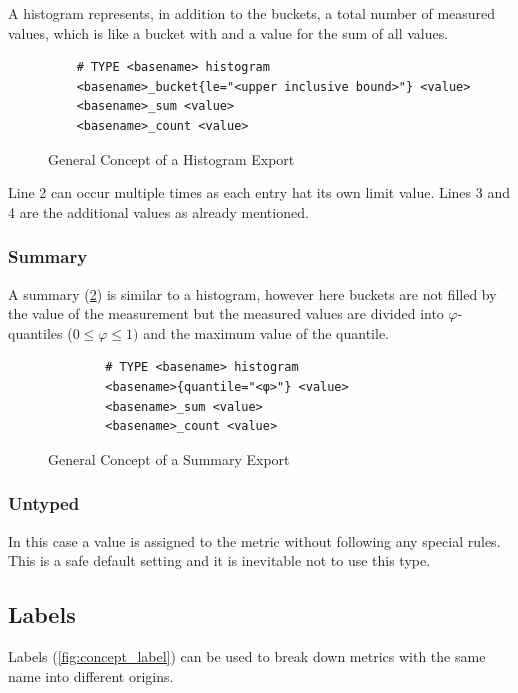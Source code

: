A histogram represents, in addition to the buckets, a total number of measured values, which is like a bucket with  and a value for the sum of all values.

\begin{figure}[!ht]
	\begin{verbatim}
	# TYPE <basename> histogram
	<basename>_bucket{le="<upper inclusive bound>"} <value>
	<basename>_sum <value>
	<basename>_count <value>
	\end{verbatim}
	\caption{General Concept of a Histogram Export}
	\label{fig:concept_histogramm}
\end{figure}

Line 2 can occur multiple times as each entry hat its own limit value. Lines 3 and 4 are the additional values as already mentioned.

\subsubsection{Summary}

A summary (\cref{fig:concept_summary}) is similar to a histogram, however here buckets are not filled by the value of the measurement but the measured values are divided into $\varphi$-quantiles ($0 \le \varphi \le 1)$ and the maximum value of the quantile.

\begin{figure}[!ht]
	\begin{verbatim}
		# TYPE <basename> histogram
		<basename>{quantile="<φ>"} <value>
		<basename>_sum <value>
		<basename>_count <value>
	\end{verbatim}
	\caption{General Concept of a Summary Export}
	\label{fig:concept_summary}
\end{figure}

\subsubsection{Untyped}

In this case a value is assigned to the metric without following any special rules. This is a safe default setting and it is inevitable not to use this type.

\subsection{Labels}

Labels (\cref{fig:concept_label}) can be used to break down metrics with the same name into different origins. 


